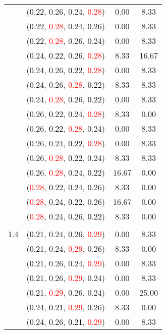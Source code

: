 \documentclass[10pt,a4paper]{report}
\begin{document}
\begin{center}
\begin{longtable}{clcc}
			&(\textcolor{black}{0.22}, 0.26, 0.24, \textcolor{red}{0.28})&0.00&8.33\\
			&(\textcolor{black}{0.22}, \textcolor{red}{0.28}, 0.24, 0.26)&0.00&8.33\\
			&(\textcolor{black}{0.22}, \textcolor{red}{0.28}, 0.26, 0.24)&0.00&8.33\\
			&(0.24, \textcolor{black}{0.22}, 0.26, \textcolor{red}{0.28})&8.33&16.67\\
			&(0.24, 0.26, \textcolor{black}{0.22}, \textcolor{red}{0.28})&0.00&8.33\\
			&(0.24, 0.26, \textcolor{red}{0.28}, \textcolor{black}{0.22})&8.33&8.33\\
			&(0.24, \textcolor{red}{0.28}, 0.26, \textcolor{black}{0.22})&0.00&8.33\\
			&(0.26, \textcolor{black}{0.22}, 0.24, \textcolor{red}{0.28})&8.33&0.00\\
			&(0.26, \textcolor{black}{0.22}, \textcolor{red}{0.28}, 0.24)&0.00&8.33\\
			&(0.26, 0.24, \textcolor{black}{0.22}, \textcolor{red}{0.28})&0.00&8.33\\
			&(0.26, \textcolor{red}{0.28}, \textcolor{black}{0.22}, 0.24)&8.33&8.33\\
			&(0.26, \textcolor{red}{0.28}, 0.24, \textcolor{black}{0.22})&16.67&0.00\\
			&(\textcolor{red}{0.28}, \textcolor{black}{0.22}, 0.24, 0.26)&8.33&0.00\\
			&(\textcolor{red}{0.28}, 0.24, \textcolor{black}{0.22}, 0.26)&16.67&0.00\\
			&(\textcolor{red}{0.28}, 0.24, 0.26, \textcolor{black}{0.22})&8.33&0.00\\
		&&&\\
		1.4			&(\textcolor{black}{0.21}, 0.24, 0.26, \textcolor{red}{0.29})&0.00&8.33\\
			&(\textcolor{black}{0.21}, 0.24, \textcolor{red}{0.29}, 0.26)&8.33&0.00\\
			&(\textcolor{black}{0.21}, 0.26, 0.24, \textcolor{red}{0.29})&0.00&8.33\\
			&(\textcolor{black}{0.21}, 0.26, \textcolor{red}{0.29}, 0.24)&0.00&8.33\\
			&(\textcolor{black}{0.21}, \textcolor{red}{0.29}, 0.26, 0.24)&0.00&25.00\\
			&(0.24, \textcolor{black}{0.21}, \textcolor{red}{0.29}, 0.26)&8.33&0.00\\
			&(0.24, 0.26, \textcolor{black}{0.21}, \textcolor{red}{0.29})&0.00&8.33\\

\end{longtable}
\end{center}
\end{document}
